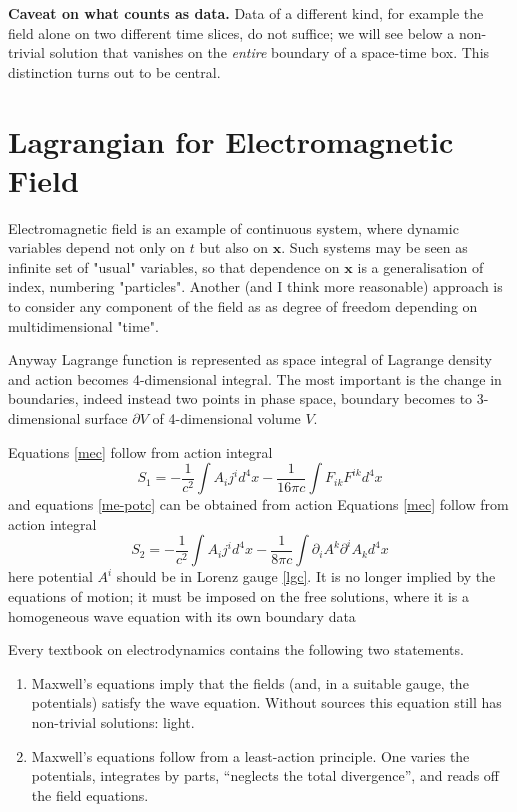 \textbf{Caveat on what counts as data.}  Data of a different
kind, for example the field alone on two different time slices, do not
suffice; we will see below a non-trivial
solution that vanishes on the \emph{entire} boundary of a space-time box.
This distinction turns out to be central.


\section{Lagrangian for Electromagnetic Field}
\label{sec:ed-lag-em}

Electromagnetic field is an example of continuous system, where
dynamic variables depend not only on $ t $ but also on $ \bm x $.
Such systems may be seen as infinite set of "usual" variables, so
that dependence on $ \bm x $ is a generalisation of index, numbering
"particles". Another (and I think more reasonable) approach is to
consider any component of the  field as as degree of freedom depending
on multidimensional "time".

Anyway Lagrange function is represented as space integral of 
Lagrange density and action becomes 4-dimensional integral.
The most important is the change in boundaries, indeed instead
two points in phase space, boundary becomes to 3-dimensional
surface $ \partial V $ of 4-dimensional volume $ V $.

Equations \eqref{mec} follow from action integral
\begin{equation}
   \label {em-ac-1}
    S_1=-\frac{1}{c^2} \int A_i j^i d^4 x-\frac{1}{16 \pi c} \int F_{ik} F^{ik} d^4 x
\end{equation}
and equations \eqref{me-potc} can be obtained from
action
Equations \eqref{mec} follow from action integral
\begin{equation}
   \label {em-ac-2}
    S_2=-\frac{1}{c^2} \int A_i j^i d^4 x-\frac{1}{8 \pi c} \int \partial_i A^k \partial^i A_k d^4 x 
\end{equation}
here potential $ A^i $ should be in Lorenz gauge \eqref{lgc}.
It is no longer implied by the equations of motion; it must be imposed on the
free solutions, where it is a homogeneous wave equation with its own
boundary data


Every textbook on electrodynamics contains the following two statements.
\begin{enumerate}
\item Maxwell's equations imply that the fields (and, in a suitable gauge,
the potentials) satisfy the wave equation. Without sources this equation
still has non-trivial solutions: light.
\item Maxwell's equations follow from a least-action principle. One varies
the potentials, integrates by parts, ``neglects the total divergence'',
and reads off the field equations.
\end{enumerate}

